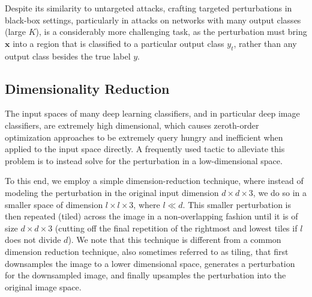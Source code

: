 \documentclass[letterpaper]{article}
\begin{document}
	Despite its similarity to untargeted attacks, crafting targeted perturbations in black-box settings, particularly in attacks on networks with many output classes (large $K$), is a considerably more challenging task, as the perturbation must bring $\mathbf{x}$ into a region that is classified to a particular output class $y_t$, rather than any output class besides the true label $y$.
	
	
	
	\subsection{Dimensionality Reduction}
	The input spaces of many deep learning classifiers, and in particular deep image classifiers, are extremely high dimensional, which causes zeroth-order optimization approaches to be extremely query hungry and inefficient when applied to the input space directly. A frequently used tactic to alleviate this problem is to instead solve for the perturbation in a low-dimensional space.
	
	To this end, we employ a simple dimension-reduction technique, where instead of modeling the perturbation in the original input dimension $d\times d\times 3$, we do so in a smaller space of dimension $l \times l \times 3$, where $l \ll d$. This smaller perturbation is then repeated (tiled) across the image in a non-overlapping fashion until it is of size $d \times d \times 3$ (cutting off the final repetition of the rightmost and lowest tiles if $l$ does not divide $d$). We note that this technique is different from a common dimension reduction technique, also sometimes referred to as tiling, that first downsamples the image to a lower dimensional space, generates a perturbation for the downsampled image, and finally upsamples the perturbation into the original image space.
	
\end{document}
